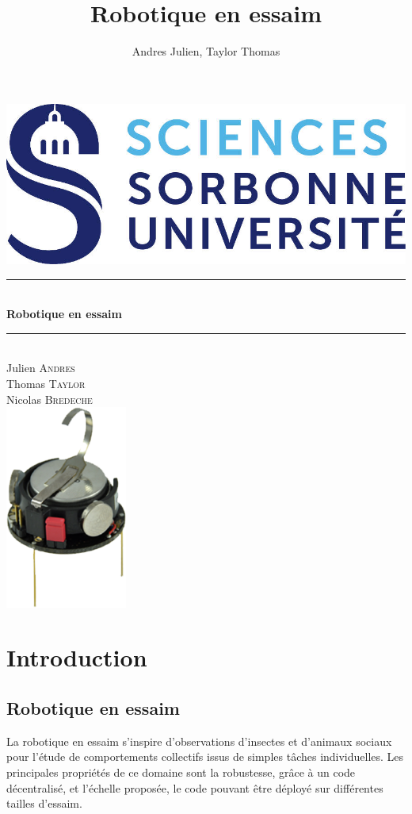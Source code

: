 \documentclass[a4paper]{article}
\title{Robotique en essaim}
\author{Andres Julien, Taylor Thomas}
\date{}
\newcommand{\HRule}{\rule{\linewidth}{0.5mm}} %
\begin{document}
\begin{titlepage}
\center
\includegraphics{incl/logo_sorbonne}\\[1cm] 

\HRule \\[0.4cm]
{ \huge \bfseries Robotique en essaim}\\[0.4cm] %
\HRule \\[1.5cm]



Julien \textsc{Andres}\\ %
Thomas \textsc{Taylor}\\[3cm]
Nicolas \textsc{Bredeche}\\[3cm]


\includegraphics[width=4cm]{incl/Kilobots.png}



\end{titlepage}

\newpage
\renewcommand{\contentsname}{Sommaire}
\tableofcontents
\newpage
\section{Introduction}
\subsection{Robotique en essaim}
La robotique en essaim s'inspire d'observations d'insectes et d'animaux sociaux pour l'étude de comportements collectifs issus de simples tâches individuelles. Les principales propriétés de ce domaine sont la robustesse, grâce à un code décentralisé, et l'échelle proposée, le code pouvant être déployé sur différentes tailles d'essaim.
\end{document}
